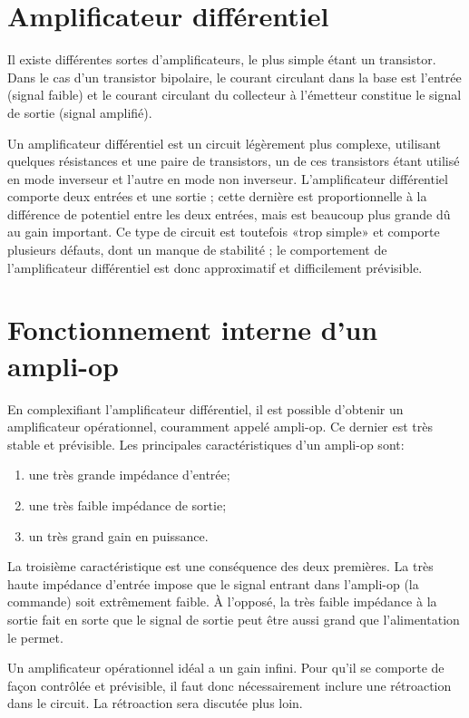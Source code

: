\documentclass[canadien,12pt,oneside,letterpaper]{article}
\begin{document}
\section{Amplificateur différentiel}

Il existe différentes sortes d'amplificateurs, le plus simple étant un transistor. Dans le cas d'un transistor bipolaire, le courant circulant dans la base est l'entrée (signal faible) et le courant circulant du collecteur à l'émetteur constitue le signal de sortie (signal amplifié).

Un amplificateur différentiel est un circuit légèrement plus complexe, utilisant quelques résistances et une paire de transistors, un de ces transistors étant utilisé en mode inverseur et l'autre en mode non inverseur. L'amplificateur différentiel comporte deux entrées et une sortie ; cette dernière est proportionnelle à la différence de potentiel entre les deux entrées, mais est beaucoup plus grande dû au gain important. Ce type de circuit est toutefois «trop simple» et comporte plusieurs défauts, dont un manque de stabilité ; le comportement de l'amplificateur différentiel est donc approximatif et difficilement prévisible.


\section{Fonctionnement interne d'un ampli-op}

En complexifiant l'amplificateur différentiel, il est possible d'obtenir un amplificateur opérationnel, couramment appelé ampli-op. Ce dernier est très stable et prévisible. Les principales caractéristiques d'un ampli-op sont:
\begin{enumerate}
\item une très grande impédance d'entrée;
\item une très faible impédance de sortie;
\item un très grand gain en puissance.
\end{enumerate}
La troisième caractéristique est une conséquence des deux premières. La très haute impédance d'entrée impose que le signal entrant dans l'ampli-op (la commande) soit extrêmement faible. À l'opposé, la très faible impédance à la sortie fait en sorte que le signal de sortie peut être aussi grand que l'alimentation le permet.

Un amplificateur opérationnel idéal a un gain infini. Pour qu'il se comporte de façon contrôlée et prévisible, il faut donc nécessairement inclure une rétroaction dans le circuit. La rétroaction sera discutée plus loin.
\end{document}
